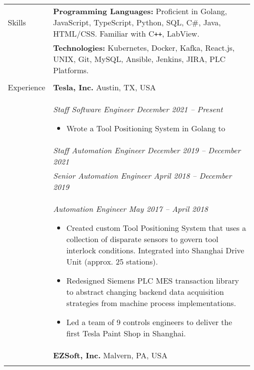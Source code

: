 \documentclass[11pt]{article}
\begin{document}
\noindent
\begin{tabular}[t]{@{}p{1.05in} @{}p{6.00in}}

{Skills}
&
\textbf{Programming Languages:} Proficient in Golang, JavaScript, TypeScript, Python, SQL, C\#, Java, HTML/CSS. Familiar with C\verb!++!, LabView.%
\vspace{0.5\baselineskip}
\\
&
\textbf{Technologies:} Kubernetes, Docker, Kafka, React.js, UNIX, Git, MySQL, Ansible, Jenkins, JIRA, PLC Platforms.%
\\
\\

{Experience}
&
\textbf{Tesla, Inc.}  \hfill Austin, TX, USA\vspace{0.015in} \\ &
 
    \textit{Staff Software Engineer \hfill December 2021 -- Present}
        \begin{itemize}[noitemsep,topsep=0pt]
                \item Wrote a Tool Positioning System in Golang to%
        \end{itemize}
\\ &
 
    \textit{Staff Automation Engineer \hfill December 2019 -- December 2021}
\\ &
 
    \textit{Senior Automation Engineer \hfill April 2018 -- December 2019}
\\ &
 
    \textit{Automation Engineer \hfill May 2017 -- April 2018}
        \begin{itemize}[noitemsep,topsep=0pt]
                \item Created custom Tool Positioning System that uses a collection of disparate sensors to govern tool interlock conditions. Integrated into Shanghai Drive Unit (approx. 25 stations).%
                \item Redesigned Siemens PLC MES transaction library to abstract changing backend data acquisition strategies from machine process implementations.%
                \item Led a team of 9 controls engineers to deliver the first Tesla Paint Shop in Shanghai.%
        \end{itemize}
\\
&
\textbf{EZSoft, Inc.}  \hfill Malvern, PA, USA\vspace{0.015in} \\ &
 

\end{tabular}
\end{document}
